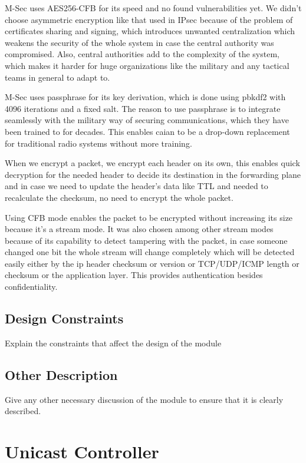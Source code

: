 M-Sec uses AES256-CFB for its speed and no found vulnerabilities yet.
We didn't choose asymmetric encryption like that used in IPsec because of the problem of certificates sharing and signing, which introduces unwanted centralization which weakens the security of the whole system in case the central authority was compromised.
Also, central authorities add to the complexity of the system, which makes it harder for huge organizations like the military and any tactical teams in general to adapt to.

M-Sec uses passphrase for its key derivation, which is done using pbkdf2 with 4096 iterations and a fixed salt.
The reason to use passphrase is to integrate seamlessly with the military way of securing communications, which they have been trained to for decades.
This enables \acrshort{caian} to be a drop-down replacement for traditional radio systems without more training.

When we encrypt a packet, we encrypt each header on its own, this enables quick decryption for the needed header to decide its destination in the forwarding plane and in case we need to update the header's data like TTL and needed to recalculate the checksum, no need to encrypt the whole packet.

Using CFB mode enables the packet to be encrypted without increasing its size because it's a stream mode.
It was also chosen among other stream modes because of its capability to detect tampering with the packet, in case someone changed one bit the whole stream will change completely which will be detected easily either by the \acrshort{ip} header checksum or version or TCP/UDP/ICMP length or checksum or the application layer.
This provides authentication besides confidentiality.

\subsection{Design Constraints}
Explain the constraints that affect the design of the module

\subsection{Other Description}
Give any other necessary discussion of the module to ensure that it is clearly described.

\section{Unicast Controller}
